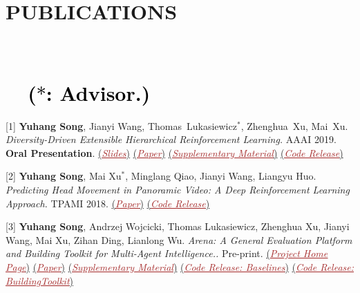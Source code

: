 \section{PUBLICATIONS{\small \textcolor{black}{~~~~~~~~~~~~~~~~~~~~~~~~~~~~~~~~~~~~~~~~~~~~~~~~~~~~~~~~~~~~~~~~~~~~~~~~~~~~~~~($*$: Advisor.)}}}
	
	\cvitem{} {[1] {\textbf{Yuhang Song}, Jianyi Wang, Thomas~Lukasiewicz$^*$, Zhenghua~Xu, Mai~Xu.
			\emph{Diversity-Driven Extensible Hierarchical Reinforcement Learning.} AAAI 2019. \textcolor{asparagus}{\textbf{Oral Presentation}}.}
			\href{https://docs.google.com/presentation/d/18olkElCpJoE0iPnyS6DpE8zH8I3mggcCvcWI5yJDJkI/edit?usp=sharing}{{(\textcolor{brown}{\underline{\textit{Slides}}})}} \href{https://www.dropbox.com/s/zt8wwwyy80f8b3q/Song.pdf?dl=0}{{(\textcolor{brown}{\underline{\textit{Paper}}})}}
			\href{https://www.dropbox.com/s/0viej0541ns7o3i/main.pdf?dl=0}{{(\textcolor{brown}{\underline{\textit{Supplementary Material}}})}}
			\href{https://github.com/YuhangSong/DEHRL}{{(\textcolor{brown}{\underline{\textit{Code Release}}})}}
	}
	
	\cvitem{} {[2] {\textbf{Yuhang Song}, Mai Xu$^*$, Minglang Qiao, Jianyi Wang, Liangyu Huo.
		\emph{Predicting Head Movement in Panoramic Video: A Deep Reinforcement Learning Approach.} TPAMI 2018.}
		\href{https://arxiv.org/abs/1710.10755}{{(\textcolor{brown}{\underline{\textit{Paper}}})}}
		\href{https://github.com/YuhangSong/DHP}{{(\textcolor{brown}{\underline{\textit{Code Release}}})}}
	}

	\cvitem{} {[3] {\textbf{Yuhang Song}, Andrzej Wojcicki, Thomas Lukasiewicz, Zhenghua Xu, Jianyi Wang, Mai Xu, Zihan Ding, Lianlong Wu.
		\emph{Arena: A General Evaluation Platform and Building Toolkit for Multi-Agent Intelligence..} Pre-print.}
			\href{https://sites.google.com/view/arena-unity/}{{(\textcolor{brown}{\underline{\textit{Project Home Page}}})}} \href{https://arxiv.org/abs/1905.08085}{{(\textcolor{brown}{\underline{\textit{Paper}}})}}
			\href{https://sites.google.com/view/arena-unity/home/supplementary}{{(\textcolor{brown}{\underline{\textit{Supplementary Material}}})}}
			\href{https://github.com/YuhangSong/Arena-Baselines}{{(\textcolor{brown}{\underline{\textit{Code Release: Baselines}}})}}
			\href{https://github.com/YuhangSong/Arena-BuildingToolkit}{{(\textcolor{brown}{\underline{\textit{Code Release: BuildingToolkit}}})}}
		}

